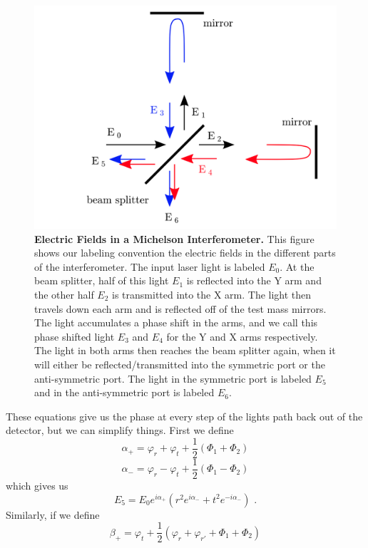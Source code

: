 \documentclass[11pt]{cuthesis}
\newcommand{\fs}{\text{ .}}
\begin{document}
\begin{figure}[ht]
\centering
\includegraphics[width=12cm]{electric_fields} 
\caption{\textbf{Electric Fields in a Michelson Interferometer.} This figure shows our labeling convention the electric fields in the different parts of the interferometer. The input laser light is labeled $E_0$. At the beam splitter, half of this light $E_1$ is reflected into the Y arm and the other half  $E_2$ is transmitted into the X arm. The light then travels down each arm and is reflected off of the test mass mirrors. The light accumulates a phase shift in the arms, and we call this phase shifted light $E_3$ and $E_4$ for the Y and X arms respectively. The light in both arms then reaches the beam splitter again, when it will either be reflected/transmitted into the symmetric port or the anti-symmetric port. The light in the symmetric port is labeled $E_5$ and in the anti-symmetric port is labeled $E_6$. \cite{ifo_tech} }
\label{fig:ef}
\end{figure} 
These equations give us the phase at every step of the lights path back out of the detector, but we can simplify things. First we define 
\begin{equation}
\alpha_+ = \varphi_r + \varphi_t + \frac{1}{2}(\Phi_1+\Phi_2)
\end{equation}
\begin{equation}
\alpha_- = \varphi_r - \varphi_t + \frac{1}{2}(\Phi_1- \Phi_2)
\end{equation}
which gives us 
\begin{equation}
E_5=E_0 e^{i \alpha_+}(r^2 e^{i \alpha_-}+t^2 e^{-i \alpha_-}) \fs
\end{equation}
Similarly, if we define
\begin{equation}
\beta_+ = \varphi_t +\frac{1}{2}(\varphi_r+\varphi_{r'}+\Phi_1+\Phi_2)	
\end{equation}
\end{document}
